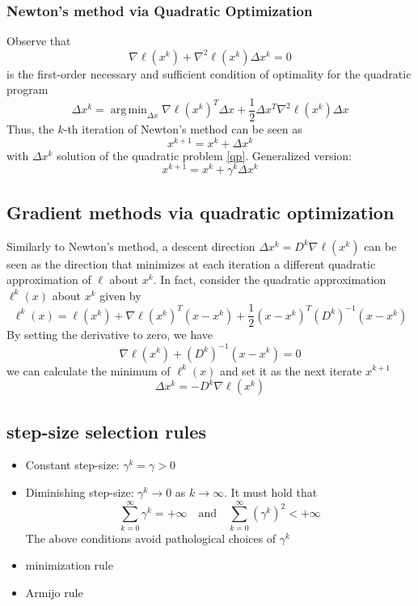 \documentclass{book}
\DeclareMathOperator*{\argmin}{arg\,min}
\theoremstyle{definition}
\theoremstyle{remark}
\theoremstyle{remark}
\begin{document}
\subsubsection{Newton's method via Quadratic Optimization}
Observe that 
\[
    \nabla\ell(x^k) +\nabla^2\ell(x^k)\Delta x^k = 0
\]
is the first-order necessary and sufficient condition of optimality for the quadratic program 
\begin{equation}
    \label{qp}
    \Delta x^k = \argmin_{\Delta x}\nabla\ell(x^k)^T \Delta x+\displaystyle\frac{1}{2}\Delta x^T\nabla^2\ell(x^k)\Delta x
\end{equation}
Thus, the $k$-th iteration of Newton's method can be seen as 
\[
    x^{k+1} = x^k+\Delta x^k
\]
with $\Delta x^k$ solution of the quadratic problem \ref{qp}. Generalized version: 
\[
    x^{k+1} = x^k + \gamma^k \Delta x^k
\]

\subsection{Gradient methods via quadratic optimization}
Similarly to Newton's method, a descent direction $\Delta x^k=D^k\nabla\ell(x^k)$ can be seen as the direction that minimizes at each iteration a different quadratic approximation of $\ell$ about $x^k$. In fact, consider the quadratic approximation $\ell^k(x)$ about $x^k$ given by 
\[
    \ell^k(x) = \ell(x^k)+\nabla\ell(x^k)^T(x-x^k)+\displaystyle\frac{1}{2}(x-x^k)^T(D^k)^{-1}(x-x^k)
\]
By setting the derivative to zero, we have 
\[
    \nabla\ell(x^k)+(D^k)^{-1}(x-x^k)=0
\]
we can calculate the minimum of $\ell^k(x)$ and set it as the next iterate $x^{k+1}$
\[
    \Delta x^k = -D^k\nabla\ell(x^k)
\]
\subsection{step-size selection rules}
\begin{itemize}
    \item Constant step-size: $\gamma^k=\gamma>0$
    \item Diminishing step-size: $\gamma^k\to 0$ as $k\to\infty$. It must hold that \[
            \displaystyle\sum_{k=0}^{\infty}\gamma^k = +\infty \quad \text{and} \quad \displaystyle\sum_{k=0}^{\infty}(\gamma^k)^2 < +\infty
        \]
        The above conditions avoid pathological choices of $\gamma^k$
    \item minimization rule
    \item Armijo rule
\end{itemize}
\end{document}
